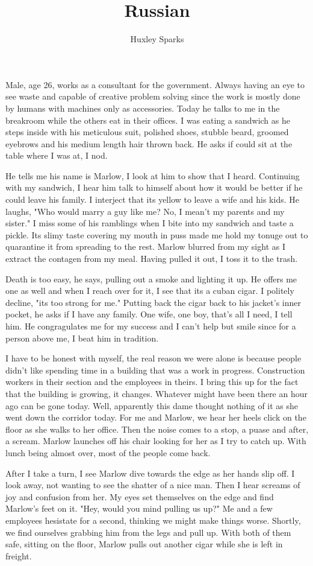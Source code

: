 \title{Russian}
\author{Huxley Sparks}

	
		Male, age 26, works as a consultant for the government. Always having an eye to see waste and capable of creative problem solving since the work is 
	mostly done by humans with machines only as accessories. Today he talks to me in the breakroom while the others eat in their offices. I was eating a sandwich
	as he steps inside with his meticulous suit, polished shoes, stubble beard, groomed eyebrows and his medium length hair thrown back. He asks if could sit
	at the table where I was at, I nod.

		He tells me his name is Marlow, I look at him to show that I heard. Continuing with my sandwich, I hear him talk to himself about how it would be
	better if he could leave his family. I interject that its yellow to leave a wife and his kids. He laughs, "Who would marry a guy like me? No, I mean't
	my parents and my sister." I miss some of his ramblings when I bite into my sandwich and taste a pickle. Its slimy taste covering my mouth in puss made me
	hold my tonuge out to quarantine it from spreading to the rest. Marlow blurred from my sight as I extract the contagen from my meal. Having pulled it out, I 
	toss it to the trash.

		Death is too easy, he says, pulling out a smoke and lighting it up. He offers me one as well and when I reach over for it, I see that its a cuban 
	cigar. I politely decline, "its too strong for me." Putting back the cigar back to his jacket's inner pocket, he asks if I have any family. One wife, one boy,
	that's all I need, I tell him. He congragulates me for my success and I can't help but smile since for a person above me, I beat him in tradition.

		I have to be honest with myself, the real reason we were alone is because people didn't like spending time in a building that was a work in progress.
	Construction workers in their section and the employees in theirs. I bring this up for the fact that the building is growing, it changes. Whatever might have
	been there an hour ago can be gone today. Well, apparently this dame thought nothing of it as she went down the corridor today. For me and Marlow, we hear
	her heels click on the floor as she walks to her office. Then the noise comes to a stop, a puase and after, a scream. Marlow launches off his chair looking for
	her as I try to catch up. With lunch being almost over, most of the people come back.

		After I take a turn, I see Marlow dive towards the edge as her hands slip off. I look away, not wanting to see the shatter of a nice man. Then I hear
	screams of joy and confusion from her. My eyes set themselves on the edge and find Marlow's feet on it. "Hey, would you mind pulling us up?" Me and a few
	employees hesistate for a second, thinking we might make things worse. Shortly, we find ourselves grabbing him from the legs and pull up. With both of them 
	safe, sitting on the floor, Marlow pulls out another cigar while she is left in freight.

